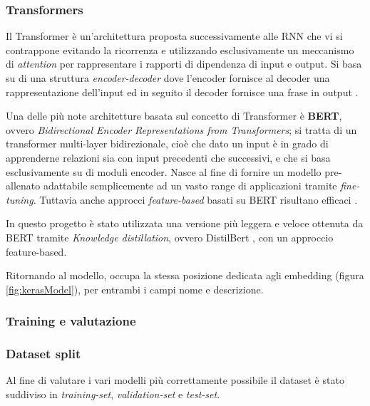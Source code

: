 \subsubsection{Transformers}
Il Transformer è un'architettura proposta successivamente alle RNN che vi si
contrappone evitando la ricorrenza e utilizzando esclusivamente un meccanismo di
\textit{attention} per rappresentare i rapporti di dipendenza di input e output.
Si basa su di una struttura \textit{encoder-decoder} dove l'encoder fornisce al
decoder una rappresentazione dell'input ed in seguito il decoder fornisce una
frase in output \cite{vaswani2017attention}.



Una delle più note architetture basata sul concetto di Transformer è
\textbf{BERT}, ovvero \textit{Bidirectional Encoder Representations from
Transformers}; si tratta di un transformer multi-layer bidirezionale, cioè 
che dato un input è in grado di apprenderne relazioni sia con input precedenti
che successivi, e che si basa esclusivamente su
di moduli encoder. Nasce al fine di fornire un modello
pre-allenato adattabile semplicemente ad un vasto range di applicazioni tramite
\textit{fine-tuning}. Tuttavia anche approcci \textit{feature-based} basati
su BERT risultano efficaci \cite{devlin2018bert}.

In questo progetto è stato utilizzata una versione più leggera e veloce ottenuta
da BERT tramite \textit{Knowledge distillation}, ovvero DistilBert
\cite{sanh2020distilbert}, con un approccio feature-based.

Ritornando al modello, occupa la stessa posizione dedicata agli embedding
(figura \ref{fig:kerasModel}), per entrambi i campi nome e descrizione.

\subsubsection{Training e valutazione}

\subsubsection{Dataset split}

Al fine di valutare i vari modelli più correttamente possibile il dataset è
stato suddiviso in \textit{training-set}, \textit{validation-set} e
\textit{test-set}.

